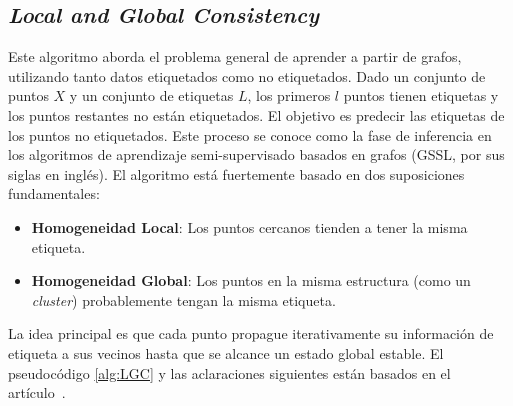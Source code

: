 \subsection{\textit{Local and Global Consistency}} \label{sec3:LGC}
Este algoritmo aborda el problema general de aprender a partir de grafos, utilizando tanto datos etiquetados como no etiquetados. Dado un conjunto de puntos $X$ y un conjunto de etiquetas $L$, los primeros $l$ puntos tienen etiquetas y los puntos restantes no están etiquetados. El objetivo es predecir las etiquetas de los puntos no etiquetados. Este proceso se conoce como la fase de inferencia en los algoritmos de aprendizaje semi-supervisado basados en grafos (GSSL, por sus siglas en inglés). El algoritmo está fuertemente basado en dos suposiciones fundamentales: 
\begin{itemize}
	\item \textbf{Homogeneidad Local}: Los puntos cercanos tienden a tener la misma etiqueta.
	\item \textbf{Homogeneidad Global}: Los puntos en la misma estructura (como un \textit{cluster}) probablemente tengan la misma etiqueta.
\end{itemize}

La idea principal es que cada punto propague iterativamente su información de etiqueta a sus vecinos hasta que se alcance un estado global estable. El pseudocódigo \ref{alg:LGC} y las aclaraciones siguientes están basados en el artículo~\cite{LGC}.

